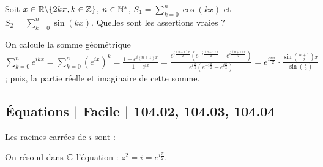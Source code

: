 \begin{question} 

Soit $x\in \mathbb{R}\backslash \{2k\pi, k \in \mathbb{Z}\}$, $n \in \mathbb{N}^*$, 
$S_1= \sum_{k=0}^{n} \cos(kx)$ et $S_2= \sum_{k=0}^{n} \sin(kx)$. Quelles sont les assertions vraies ?
\begin{answers}
    
    
    
    
    
    

\end{answers}
\begin{explanations}
On calcule la somme géométrique $\sum_{k=0}^{n} e^{ikx}= \sum_{k=0}^{n} (e^{ix})^k = \frac{1-e^{i(n+1)x}}{1-e^{ix}}=\frac{e^{i\frac{(n+1)x}{2}}(e^{-i\frac{(n+1)x}{2}}-e^{i\frac{(n+1)x}{2}})}{e^{i\frac{x}{2}}(e^{-i\frac{x}{2}}-e^{i\frac{x}{2}})}= e^{i\frac{nx}{2}}\cdot  \frac{\sin (\frac{n+1}{2})x}{\sin (\frac{x}{2})}$; puis, la partie réelle
et imaginaire de cette somme.
\end{explanations}

\end{question}

\subsection{Équations | Facile | 104.02, 104.03, 104.04}




\begin{question} 
Les racines carrées de $i$ sont : 
\begin{answers}


\end{answers}
\begin{explanations}
On résoud dans $\mathbb{C}$ l'équation : $z^2=i=e^{i\frac{\pi}{2}}$. 
\end{explanations}

\end{question}


